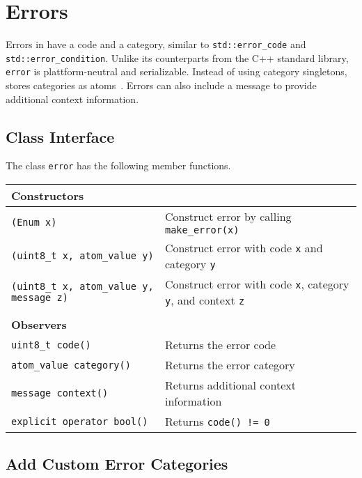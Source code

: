 \section{Errors}
\label{error}

Errors in \lib have a code and a category, similar to \lstinline^std::error_code^ and \lstinline^std::error_condition^. Unlike its counterparts from the C++ standard library, \lstinline^error^ is plattform-neutral and serializable. Instead of using category singletons, \lib stores categories as atoms~. Errors can also include a message to provide additional context information.

\subsection{Class Interface}

The class \lstinline^error^ has the following member functions.

{\small
\begin{tabular*}{\textwidth}{m{}m{}}
  \multicolumn{2}{l}{\textbf{Constructors}\vspace{3pt}} \\
  \hline
  \lstinline^(Enum x)^ & Construct error by calling \lstinline^make_error(x)^ \\
  \hline
  \lstinline^(uint8_t x, atom_value y)^ & Construct error with code \lstinline^x^ and category \lstinline^y^ \\
  \hline
  \lstinline^(uint8_t x, atom_value y, message z)^ & Construct error with code \lstinline^x^, category \lstinline^y^, and context \lstinline^z^ \\
  \hline
  \\
  \multicolumn{2}{l}{\textbf{Observers}\vspace{3pt}} \\
  \hline
  \lstinline^uint8_t code()^ & Returns the error code \\
  \hline
  \lstinline^atom_value category()^ & Returns the error category \\
  \hline
  \lstinline^message context()^ & Returns additional context information \\
  \hline
  \lstinline^explicit operator bool()^ & Returns \lstinline^code() != 0^ \\
  \hline
\end{tabular*}
}

\subsection{Add Custom Error Categories}
\label{custom-error}

